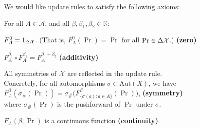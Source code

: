 \documentclass{article}
\begin{document}
We would like update rules to satisfy the following axioms:

For all $A \in \mathcal A$, and all $\beta,\beta_1, \beta_2 \in \mathbb R$:

%
%
%
\begin{URaxioms}
    \item  $F^{0}_A  = {1}_{\Delta\mathcal X}$. (That is, $F^{0}_A(\Pr) = \Pr$ for all $\Pr \in \Delta\mathcal X$.)
        \hfill \textbf{(zero)} \label{ax:zero}
    \item $F^{\beta_1}_A \circ F^{\beta_2}_A = F^{\beta_1 + \beta_2}_A$
        \hfill \textbf{(additivity)} \label{ax:additivity}
    \item All symmetries of $\mathcal X$ are reflected in the update rule. \\
        Concretely, for all automorphisms $\sigma
            \in \mathrm{Aut}(X)$, we have \\
        \indent\hspace{2em}$F^\beta_A(\sigma_\#(\Pr)) = \sigma_\#\Big(F^\beta_{\{\sigma(a) : a \in A \}}(\Pr)\Big)$,
            \hfill \textbf{(symmetry)} \label{ax:symmetry}
        \\
        where $\sigma_\#(\Pr)$ is the pushforward of $\Pr$ under $\sigma$.
    \item $F_A(\beta, \Pr)$ is a continuous function
            \hfill \textbf{(continuity)} \label{ax:continuity}
\end{URaxioms}
\end{document}
